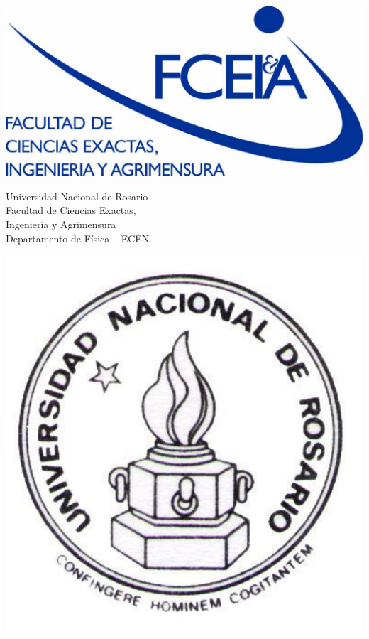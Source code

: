 \documentclass[a4paper, 12pt]{article}
\begin{document}
\renewcommand{\tablename}{Tabla}
\renewcommand{\refname}{Bibliografía}



\begin{titlepage}

\begin{minipage}{2.6cm}
\includegraphics[width=\textwidth]{fceia.pdf}
\end{minipage}
\hfill
%
\begin{minipage}{6cm}
\begin{center}
\normalsize{Universidad Nacional de Rosario\\
Facultad de Ciencias Exactas,\\
Ingeniería y Agrimensura\\
Departamento de Física -- ECEN\\}
\end{center}
\end{minipage}
\hspace{0.5cm}
\hfill
\begin{minipage}{2.6cm}
\includegraphics[width=\textwidth]{unr.pdf}
\end{minipage}



\end{titlepage}
\end{document}

